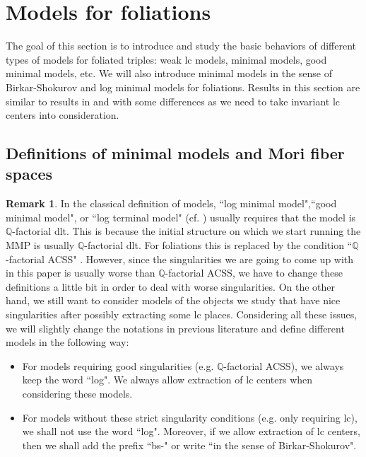 \documentclass[11pt]{amsart}
\numberwithin{equation}{section}
\newcommand{\Qq}{\mathbb{Q}}
\theoremstyle{definition}
\theoremstyle{definition}
\newtheorem{rem}[thm]{Remark}
\theoremstyle{definition}
\begin{document}
\section{Models for foliations}\label{sec: models}

The goal of this section is to introduce and study the basic behaviors of different types of models for foliated triples: weak lc models, minimal models, good minimal models, etc. We will also introduce minimal models in the sense of Birkar-Shokurov and log minimal models for foliations. Results in this section are similar to results in \cite[Section 2]{Bir12} and \cite[Section 3]{HL23} with some differences as we need to take invariant lc centers into consideration.

\subsection{Definitions of minimal models and Mori fiber spaces}

\begin{rem}
    In the classical definition of models, ``log minimal model",``good minimal model", or ``log terminal model" (cf. \cite{BCHM10,Bir12}) usually requires that the model is $\Qq$-factorial dlt. This is because the initial structure on which we start running the MMP is usually $\Qq$-factorial dlt. For foliations this is replaced by the condition ``$\Qq$-factorial ACSS" \cite{CHLX23}. However, since the singularities we are going to come up with in this paper is usually worse than $\Qq$-factorial ACSS, we have to change these definitions a little bit in order to deal with worse singularities. On the other hand, we still want to consider models of the objects we study that have nice singularities after possibly extracting some lc places. Considering all these issues, we will slightly change the notations in previous literature and define different models in the following way:
    \begin{itemize}
        \item For models requiring good singularities (e.g. $\Qq$-factorial ACSS), we always keep the word ``log". We always allow extraction of lc centers when considering these models.
        \item For models without these strict singularity conditions (e.g. only requiring lc), we shall not use the word ``log". Moreover, if we allow extraction of lc centers, then we shall add the prefix ``bs-" or write ``in the sense of Birkar-Shokurov".
    \end{itemize}
\end{rem}
\end{document}
